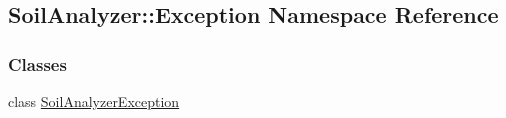 \hypertarget{namespace_soil_analyzer_1_1_exception}{}\subsection{Soil\+Analyzer\+:\+:Exception Namespace Reference}
\label{namespace_soil_analyzer_1_1_exception}
\subsubsection*{Classes}
\begin{DoxyCompactItemize}
\item 
class \hyperlink{class_soil_analyzer_1_1_exception_1_1_soil_analyzer_exception}{Soil\+Analyzer\+Exception}
\end{DoxyCompactItemize}
